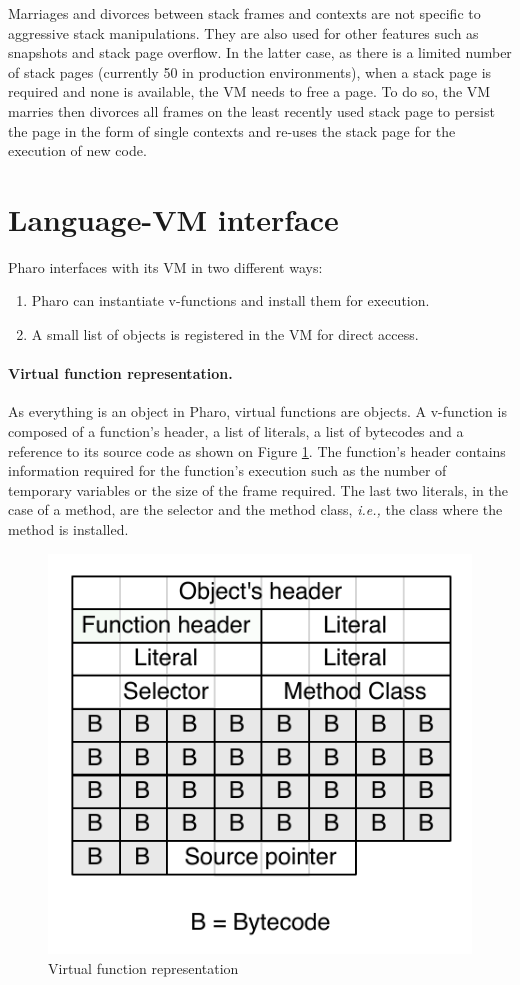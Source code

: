 \documentclass[a4paper,12pt,twoside]{../includes/ThesisStyle}
\begin{document}
Marriages and divorces between stack frames and contexts are not specific to aggressive stack manipulations. They are also used for other features such as snapshots and stack page overflow. In the latter case, as there is a limited number of stack pages (currently 50 in production environments), when a stack page is required and none is available, the VM needs to free a page. To do so, the VM marries then divorces all frames on the least recently used stack page to persist the page in the form of single contexts and re-uses the stack page for the execution of new code. 



\section{Language-VM interface}

Pharo interfaces with its VM in two different ways:
\begin{enumerate}
	\item Pharo can instantiate v-functions and install them for execution.
	\item A small list of objects is registered in the VM for direct access.
\end{enumerate}

\paragraph{Virtual function representation.}

As everything is an object in Pharo, virtual functions are objects. A v-function is composed of a function's header, a list of literals, a list of bytecodes and a reference to its source code as shown on Figure \ref{fig:CompiledCode}. The function's header contains information required for the function's execution such as the number of temporary variables or the size of the frame required. The last two literals, in the case of a method, are the selector and the method class, \emph{i.e.,} the class where the method is installed.

\begin{figure}[h!]
    \begin{center}
        \includegraphics[width=0.38\linewidth]{CompiledCode}
        \caption{Virtual function representation}
        \label{fig:CompiledCode}
    \end{center}
\end{figure}
\end{document}
